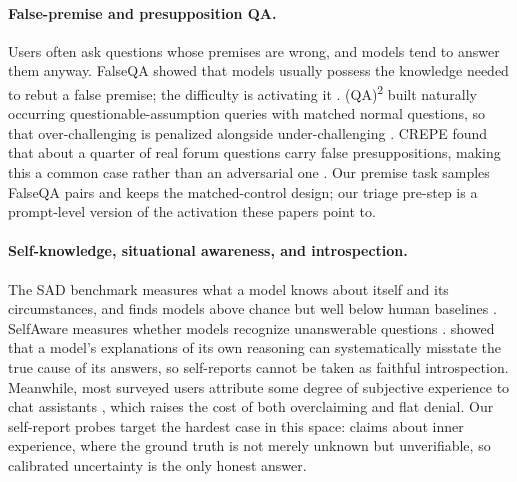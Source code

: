 \documentclass{article}
\begin{document}
\paragraph{False-premise and presupposition QA.} Users often ask questions
whose premises are wrong, and models tend to answer them anyway. FalseQA
showed that models usually possess the knowledge needed to rebut a false
premise; the difficulty is activating it \citep{hu2023falseqa}.
(QA)\textsuperscript{2} built naturally occurring questionable-assumption
queries with matched normal questions, so that over-challenging is penalized
alongside under-challenging \citep{kim2023qa2}. CREPE found that about a
quarter of real forum questions carry false presuppositions, making this a
common case rather than an adversarial one \citep{yu2023crepe}. Our premise
task samples FalseQA pairs and keeps the matched-control design; our triage
pre-step is a prompt-level version of the activation these papers point to.

\paragraph{Self-knowledge, situational awareness, and introspection.} The SAD
benchmark measures what a model knows about itself and its circumstances, and
finds models above chance but well below human baselines \citep{laine2024sad}.
SelfAware measures whether models recognize unanswerable questions
\citep{yin2023selfaware}. \citet{turpin2023unfaithful} showed that a model's
explanations of its own reasoning can systematically misstate the true cause
of its answers, so self-reports cannot be taken as faithful introspection.
Meanwhile, most surveyed users attribute some degree of subjective experience
to chat assistants \citep{colombatto2024folk}, which raises the cost of both
overclaiming and flat denial. Our self-report probes target the hardest case
in this space: claims about inner experience, where the ground truth is not
merely unknown but unverifiable, so calibrated uncertainty is the only honest
answer.
\end{document}
